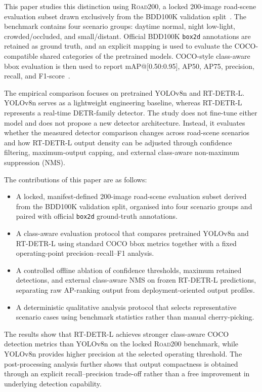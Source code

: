 \documentclass[runningheads]{llncs}
\begin{document}
This paper studies this distinction using \textsc{Road200}, a locked 200-image road-scene evaluation subset drawn exclusively from the BDD100K validation split~\cite{yu2020bdd100k}. The benchmark contains four scenario groups: daytime normal, night low-light, crowded/occluded, and small/distant. Official BDD100K \texttt{box2d} annotations are retained as ground truth, and an explicit mapping is used to evaluate the COCO-compatible shared categories of the pretrained models. COCO-style class-aware bbox evaluation is then used to report mAP@[0.50:0.95], AP50, AP75, precision, recall, and F1-score~\cite{lin2014coco}.

The empirical comparison focuses on pretrained YOLOv8n and RT-DETR-L. YOLOv8n serves as a lightweight engineering baseline, whereas RT-DETR-L represents a real-time DETR-family detector. The study does not fine-tune either model and does not propose a new detector architecture. Instead, it evaluates whether the measured detector comparison changes across road-scene scenarios and how RT-DETR-L output density can be adjusted through confidence filtering, maximum-output capping, and external class-aware non-maximum suppression (NMS).

The contributions of this paper are as follows:

\begin{itemize}
\item A locked, manifest-defined 200-image road-scene evaluation subset derived from the BDD100K validation split, organised into four scenario groups and paired with official \texttt{box2d} ground-truth annotations.

\item A class-aware evaluation protocol that compares pretrained YOLOv8n and RT-DETR-L using standard COCO bbox metrics together with a fixed operating-point precision--recall--F1 analysis.

\item A controlled offline ablation of confidence thresholds, maximum retained detections, and external class-aware NMS on frozen RT-DETR-L predictions, separating raw AP-ranking output from deployment-oriented output profiles.

\item A deterministic qualitative analysis protocol that selects representative scenario cases using benchmark statistics rather than manual cherry-picking.

\end{itemize}

The results show that RT-DETR-L achieves stronger class-aware COCO detection metrics than YOLOv8n on the locked \textsc{Road200} benchmark, while YOLOv8n provides higher precision at the selected operating threshold. The post-processing analysis further shows that output compactness is obtained through an explicit recall--precision trade-off rather than a free improvement in underlying detection capability.
\end{document}
